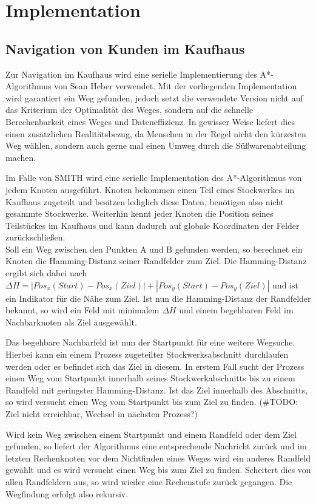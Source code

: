 \section{Implementation}

\subsection{Navigation von Kunden im Kaufhaus}
\label{kundne:nav}
Zur Navigation im Kaufhaus wird eine serielle Implementierung des A*-Algorithmus von Sean Heber verwendet.
Mit der vorliegenden Implementation wird garantiert ein Weg gefunden, jedoch setzt die verwendete Version nicht auf das Kriterium der Optimalität des Weges, sondern auf die schnelle Berechenbarkeit eines Weges und Dateneffizienz. In gewisser Weise liefert dies einen zusätzlichen Realitätsbezug, da Menschen in der Regel nicht den kürzesten Weg wählen, sondern auch gerne mal einen Umweg durch die Süßwarenabteilung machen.

Im Falle von SMITH wird eine serielle Implementation des A*-Algorithmus von jedem Knoten ausgeführt. Knoten bekommen einen Teil eines Stockwerkes im Kaufhaus zugeteilt und besitzen lediglich diese Daten, benötigen also nicht gesammte Stockwerke. Weiterhin kennt jeder Knoten die Position seines Teilstückes im Kaufhaus und kann dadurch auf globale Koordinaten der Felder zurückschließen.\\
Soll ein Weg zwischen den Punkten A und B gefunden werden, so berechnet ein Knoten die Hamming-Distanz seiner Randfelder zum Ziel. Die Hamming-Distanz ergibt sich dabei nach $\Delta H = |Pos_x(Start)-Pos_x(Ziel)| + |Pos_y(Start)-Pos_y(Ziel)|$ und ist ein Indikator für die Nähe zum Ziel.
Ist nun die Hamming-Distanz der Randfelder bekannt, so wird ein Feld mit minimalem $\Delta H$ und einem begehbaren Feld im Nachbarknoten als Ziel ausgewählt.

Das begehbare Nachbarfeld ist nun der Startpunkt für eine weitere Wegsuche. Hierbei kann ein einem Prozess zugeteilter Stockwerksabschnitt durchlaufen werden oder es befindet sich das Ziel in diesem. In erstem Fall sucht der Prozess einen Weg vom Startpunkt innerhalb seines Stockwerkabschnitts bis zu einem Randfeld mit geringster Hamming-Distanz. Ist das Ziel innerhalb des Abschnitts, so wird versucht einen Weg vom Startpunkt bis zum Ziel zu finden. (\#TODO: Ziel nicht erreichbar, Wechsel in nächsten Prozess?)

Wird kein Weg zwischen einem Startpunkt und einem Randfeld oder dem Ziel gefunden, so liefert der Algorithmus eine entsprechende Nachricht zurück und im letzten Rechenknoten vor dem Nichtfinden eines Weges wird ein anderes Randfeld gewählt und es wird versucht einen Weg bis zum Ziel zu finden. Scheitert dies von allen Randfeldern aus, so wird wieder eine Rechenstufe zurück gegangen. Die Wegfindung erfolgt also rekursiv.

